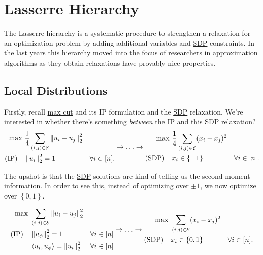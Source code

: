 \section{Lasserre Hierarchy}
The Lasserre hierarchy is a systematic procedure to strengthen a relaxation for an optimization problem by adding additional variables and \hyperref[def:SDP]{SDP} constraints. In the last years this hierarchy moved into the focus of researchers in approximation algorithms as they obtain relaxations have provably nice properties.

\subsection{Local Distributions}
Firstly, recall \hyperref[prb:max-cut]{max cut} and its IP formulation and the \hyperref[def:SDP]{SDP} relaxation. We're interested in whether there's something \emph{between} the IP and this \hyperref[def:SDP]{SDP} relaxation?
\[
	\begin{aligned}
		\max~            & \frac{1}{4} \sum_{(i, j)\in \mathcal{\MakeUppercase{e}} } \left\lVert u_i - u_j\right\rVert _2^2                     \\
		(\text{IP})\quad & \left\lVert u_i\right\rVert _2^2 = 1                                                             & \forall i\in [n],
	\end{aligned} \to \ldots \to \begin{aligned}
		\max~             & \frac{1}{4} \sum_{(i, j)\in \mathcal{\MakeUppercase{e}} }  (x_i - x_j)^{2}                     \\
		(\text{SDP})\quad & x_i \in \left\{ \pm 1 \right\}                                             & \forall i\in [n].
	\end{aligned}
\]

The upshot is that the \hyperref[def:SDP]{SDP} solutions are kind of telling us the second moment information. In order to see this, instead of optimizing over \(\pm 1\), we now optimize over \(\left\{ 0, 1 \right\} \).

\[
	\begin{aligned}
		\max~            & \sum_{(i, j)\in \mathcal{\MakeUppercase{e}} } \left\lVert u_i - u_j\right\rVert _2^2                    \\
		(\text{IP})\quad & \left\lVert u_{\phi}\right\rVert _2^2 = 1                                            & \forall i\in [n] \\
		                 & \left\langle u_i, u_{\phi } \right\rangle = \left\lVert u_i\right\rVert _2^2         & \forall i\in [n]
	\end{aligned} \to \ldots \to \begin{aligned}
		\max~             & \sum_{(i, j)\in \mathcal{\MakeUppercase{e}} }  (x_i - x_j)^{2}                     \\
		(\text{SDP})\quad & x_i \in \left\{ 0, 1 \right\}                                  & \forall i\in [n].
	\end{aligned}
\]

